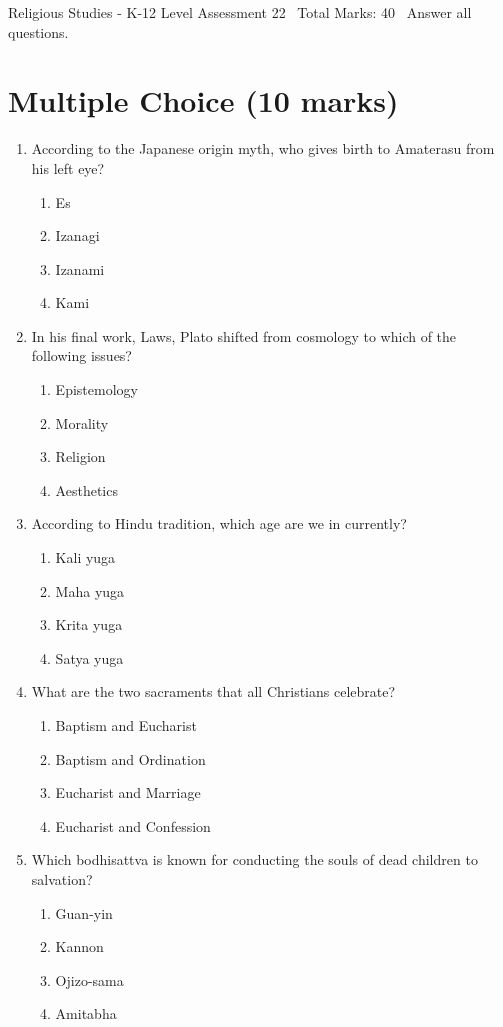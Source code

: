 \documentclass[12pt]{article}
\begin{document}
\begin{center}
Religious Studies - K-12 Level Assessment 22 \
Total Marks: 40 \
Answer all questions.
\end{center}

\section*{Multiple Choice (10 marks)}
\begin{enumerate}[label=\arabic*.]
\item According to the Japanese origin myth, who gives birth to Amaterasu from his left eye?
\begin{enumerate}[label=(\alph*)]
    \item Es
    \item Izanagi
    \item Izanami
    \item Kami
\end{enumerate}
\item In his final work, Laws, Plato shifted from cosmology to which of the following issues?
\begin{enumerate}[label=(\alph*)]
    \item Epistemology
    \item Morality
    \item Religion
    \item Aesthetics
\end{enumerate}
\item According to Hindu tradition, which age are we in currently?
\begin{enumerate}[label=(\alph*)]
    \item Kali yuga
    \item Maha yuga
    \item Krita yuga
    \item Satya yuga
\end{enumerate}
\item What are the two sacraments that all Christians celebrate?
\begin{enumerate}[label=(\alph*)]
    \item Baptism and Eucharist
    \item Baptism and Ordination
    \item Eucharist and Marriage
    \item Eucharist and Confession
\end{enumerate}
\item Which bodhisattva is known for conducting the souls of dead children to salvation?
\begin{enumerate}[label=(\alph*)]
    \item Guan-yin
    \item Kannon
    \item Ojizo-sama
    \item Amitabha
\end{enumerate}
\end{enumerate}
\end{document}
